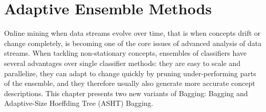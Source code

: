 \chapter{Adaptive Ensemble Methods}
\label{ch:ensemblemethods}


Online mining when data streams evolve over time,
that is when concepts drift or change completely,
is becoming one of the core issues of advanced analysis of data streams.
When tackling non-stationary concepts, ensembles of classifiers
have several advantages over single classifier methods:
they are easy to scale and parallelize, they can adapt to change
quickly by pruning under-performing parts of the ensemble, and they
therefore usually also generate more accurate concept descriptions.
This chapter presents two new  variants of Bagging: \adwin
Bagging and Adaptive-Size Hoeffding Tree (ASHT) Bagging.

